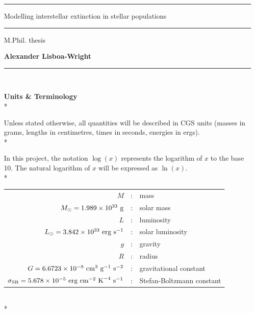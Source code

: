 \documentclass[12pt, a4paper]{report}
\begin{document}
\begin{titlepage}

\vspace*{-0.4cm}

\begin{center}
\hrule
\vspace*{0.5cm}
{\Huge \sc Modelling interstellar extinction in stellar populations \par}
\vspace*{0.5cm}
\hrule

\vspace*{5mm}
{\normalsize M.Phil. thesis}

\vfill

{\bf Alexander Lisboa-Wright}

\end{center}

\vspace*{1.0cm}

\hrule
\vspace*{0.2cm}
\\

\end{titlepage}

\begin{abstract}
\end{abstract}

\textbf{Units \& Terminology}\\*

Unless stated otherwise, all quantities will be described in CGS units (masses in grams, lengths in centimetres, times in seconds, energies in ergs). \\*

In this project, the notation $\log(x)$ represents the logarithm of $x$ to the base 10. The natural logarithm of $x$ will be expressed as $\ln(x)$. \\*

\begin{tabular}{r@{ }c@{ }l}
$M$ &:& mass\\
$M_{\odot} = 1.989 \times 10^{33} \textnormal{ g}$ &:& solar mass\\
$L$ &:& luminosity\\
$L_{\odot} = 3.842 \times 10^{33} \textnormal{ erg s}^{-1}$ &:& solar luminosity\\
$g$ &:& gravity\\
$R$ &:& radius\\
$G = 6.6723 \times 10^{-8} \textnormal{ cm}^{3} \textnormal{ g}^{-1} \textnormal{ s}^{-2}$ &:& gravitational constant\\
$\sigma_{\textnormal{SB}} = 5.678 \times 10^{-5} \textnormal{ erg cm}^{-2} \textnormal{ K}^{-4} \textnormal{ s}^{-1}$ & : & Stefan-Boltzmann constant\\
\end{tabular}
\\*
\end{document}
